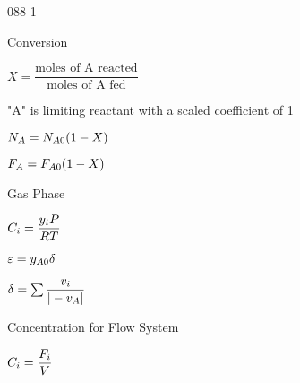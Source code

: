\begin{mitframe}{088-1}


\begin{listone}
	\item Conversion
	\begin{listtwo}
		\item $X=\dfrac{\text{moles of A reacted}}{\text{moles of A fed}}$
		
        \begin{listthree}
			\item "A" is limiting reactant with a scaled coefficient of 1
		\end{listthree}
		
		\item $\nummoles_{A}=\nummoles_{A\init}(1-X)$
		\item $\force_{A}=\force_{A\init}(1-X)$
    \end{listtwo}
	
	\item Gas Phase
	\begin{listtwo}
		\item $\conc_{\state}=\dfrac{y_{\state}\p}{\gasconst\Temp}$
        \item $\varepsilon=y_{A\init}\blthick$
        \item $\blthick=\sum\nolimits\dfrac{\vvel_{\state}}{|-\vvel_{A}|}$
	\end{listtwo}

	\item Concentration for Flow System
	\begin{listtwo}
		\item $\conc_{\state}=\dfrac{\force_{\state}}{\vol}$
	\end{listtwo}
\end{listone}

\end{mitframe}